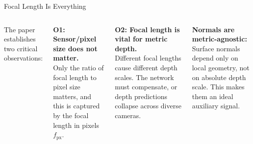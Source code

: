 \begin{frame}{Focal Length Is Everything}
\begin{columns}[T]
The paper establishes two critical observations:

\vspace{0.3cm}
\textbf{O1: Sensor/pixel size does not matter.}\\
Only the ratio of focal length to pixel size matters, and this is captured by the focal length in pixels $f_{\text{px}}$.

\vspace{0.3cm}
\textbf{O2: Focal length is vital for metric depth.}\\
Different focal lengths cause different depth scales. The network must compensate, or depth predictions collapse across diverse cameras.

\vspace{0.3cm}
\textbf{Normals are metric-agnostic:}\\
Surface normals depend only on local geometry, not on absolute depth scale. This makes them an ideal auxiliary signal.

\end{columns}
\end{frame}

